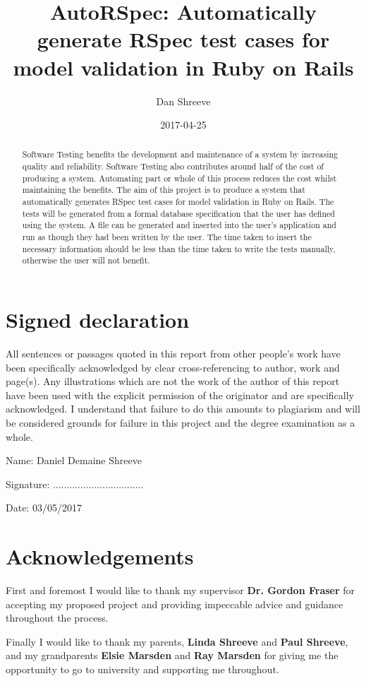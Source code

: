 \documentclass[a4paper,12pt]{article}
\title{AutoRSpec: Automatically generate RSpec test cases for model validation in Ruby on Rails}
\date{2017-04-25}
\author{Dan Shreeve}
\begin{document}

\newpage
\thispagestyle{empty}
\mbox{}
\newpage
{}
\maketitle
\newpage
\thispagestyle{empty}
\mbox{}
\newpage
\newpage
{}
\section*{Signed declaration}
All sentences or passages quoted in this report from other people's work have been specifically acknowledged by clear cross-referencing to author, work and page(s). Any illustrations which are not the work of the author of this report have been used with the explicit permission of the originator and are specifically acknowledged. I understand that failure to do this amounts to plagiarism and will be considered grounds for failure in this project and the degree examination as a whole.
\par Name: Daniel Demaine Shreeve
\par Signature: .................................
\par Date: 03/05/2017
\newpage
\thispagestyle{empty}
\mbox{}
\newpage
\newpage
{}
\begin{abstract}
Software Testing benefits the development and maintenance of a system by increasing quality and reliability. Software Testing also contributes around half of the cost of producing a system. Automating part or whole of this process reduces the cost whilst maintaining the benefits. The aim of this project is to produce a system that automatically generates RSpec test cases for model validation in Ruby on Rails. The tests will be generated from a formal database specification that the user has defined using the system. A file can be generated and inserted into the user's application and run as though they had been written by the user. The time taken to insert the necessary information should be less than the time taken to write the tests manually, otherwise the user will not benefit.
\end{abstract}

\newpage
{}
\section*{Acknowledgements}
First and foremost I would like to thank my supervisor \textbf{Dr. Gordon Fraser} for accepting my proposed project and providing impeccable advice and guidance throughout the process.
\par Finally I would like to thank my parents, \textbf{Linda Shreeve} and \textbf{Paul Shreeve}, and my grandparents \textbf{Elsie Marsden} and \textbf{Ray Marsden} for giving me the opportunity to go to university and supporting me throughout.
\end{document}
